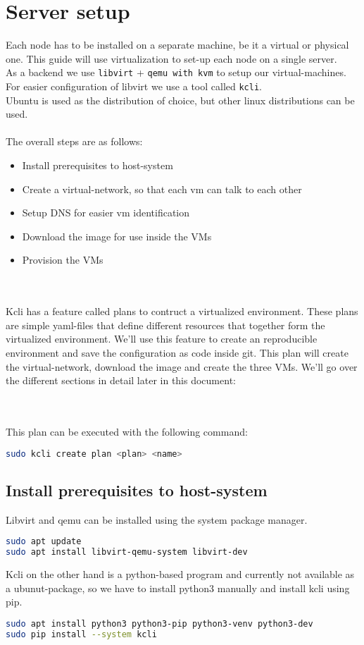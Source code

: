 \section{Server setup}
Each node has to be installed on a separate machine, be it a virtual or physical one. This guide will use virtualization to set-up each node on a single server.
\\
As a backend we use \texttt{libvirt} + \texttt{qemu with kvm} to setup our virtual-machines. For easier configuration of libvirt we use a tool called \texttt{kcli}.
\\
Ubuntu is used as the distribution of choice, but other linux distributions can be used.
\\\\
The overall steps are as follows:
\begin{itemize}
	\item Install prerequisites to host-system
	\item Create a virtual-network, so that each vm can talk to each other
	\item Setup DNS for easier vm identification
	\item Download the image for use inside the VMs
	\item Provision the VMs
\end{itemize}
\\\\
Kcli has a feature called plans to contruct a virtualized environment. These plans are simple yaml-files that define different resources that together form the virtualized environment.
We'll use this feature to create an reproducible environment and save the configuration as code inside git. This plan will create the virtual-network, download the image and create the three VMs. We'll go over the different sections in detail later in this document:

\\\\
This plan can be executed with the following command:
\begin{lstlisting}[language=bash]
sudo kcli create plan <plan> <name>
\end{lstlisting}

\subsection{Install prerequisites to host-system}
Libvirt and qemu can be installed using the system package manager.
\begin{lstlisting}[language=bash] 
sudo apt update
sudo apt install libvirt-qemu-system libvirt-dev
\end{lstlisting}
Kcli on the other hand is a python-based program and currently not available as a ubunut-package, so we have to install python3 manually and install kcli using pip.
\begin{lstlisting}[language=bash] 
sudo apt install python3 python3-pip python3-venv python3-dev
sudo pip install --system kcli
\end{lstlisting}

